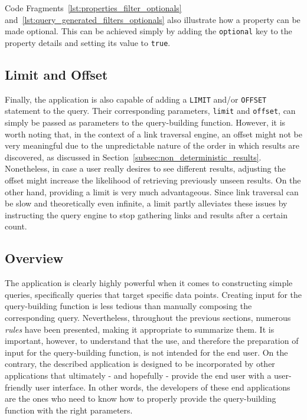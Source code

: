 Code Fragments~\ref{lst:properties_filter_optionals} and~\ref{lst:query_generated_filters_optionals} also illustrate how a property can be made optional. This can be achieved simply by adding the \texttt{optional} key to the property details and setting its value to \texttt{true}.

\subsection{Limit and Offset}
\label{subsec:limit_offset}

Finally, the application is also capable of adding a \texttt{LIMIT} and/or \texttt{OFFSET} statement to the query. Their corresponding parameters, \texttt{limit} and \texttt{offset}, can simply be passed as parameters to the query-building function. However, it is worth noting that, in the context of a link traversal engine, an offset might not be very meaningful due to the unpredictable nature of the order in which results are discovered, as discussed in Section~\ref{subsec:non_deterministic_results}. Nonetheless, in case a user really desires to see different results, adjusting the offset might increase the likelihood of retrieving previously unseen results. On the other hand, providing a limit is very much advantageous. Since link traversal can be slow and theoretically even infinite, a limit partly alleviates these issues by instructing the query engine to stop gathering links and results after a certain count.

\subsection{Overview}
\label{subsec:building_queries_predicate_sequences_overview}

The application is clearly highly powerful when it comes to constructing simple queries, specifically queries that target specific data points. Creating input for the query-building function is less tedious than manually composing the corresponding query. Nevertheless, throughout the previous sections, numerous \textit{rules} have been presented, making it appropriate to summarize them. It is important, however, to understand that the use, and therefore the preparation of input for the query-building function, is not intended for the end user. On the contrary, the described application is designed to be incorporated by other applications that ultimately - and hopefully - provide the end user with a user-friendly user interface. In other words, the developers of these end applications are the ones who need to know how to properly provide the query-building function with the right parameters.

